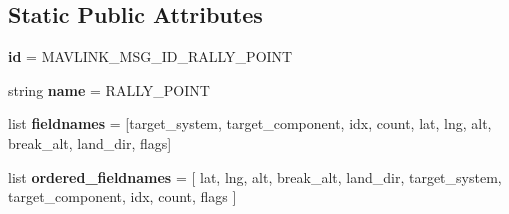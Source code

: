 \subsection*{Static Public Attributes}
\begin{DoxyCompactItemize}
\item 
\mbox{\label{classpymavlink_1_1dialects_1_1v10_1_1MAVLink__rally__point__message_ada641cb5fb37a97a94c88d9fa60c417f}} 
{\bfseries id} = M\+A\+V\+L\+I\+N\+K\+\_\+\+M\+S\+G\+\_\+\+I\+D\+\_\+\+R\+A\+L\+L\+Y\+\_\+\+P\+O\+I\+NT
\item 
\mbox{\label{classpymavlink_1_1dialects_1_1v10_1_1MAVLink__rally__point__message_ae863ad6e47a51b3049ac8678e47e5eeb}} 
string {\bfseries name} = \textquotesingle{}R\+A\+L\+L\+Y\+\_\+\+P\+O\+I\+NT\textquotesingle{}
\item 
\mbox{\label{classpymavlink_1_1dialects_1_1v10_1_1MAVLink__rally__point__message_a72ef1a386d515ff1b5e73f6b8b97f93c}} 
list {\bfseries fieldnames} = \mbox{[}\textquotesingle{}target\+\_\+system\textquotesingle{}, \textquotesingle{}target\+\_\+component\textquotesingle{}, \textquotesingle{}idx\textquotesingle{}, \textquotesingle{}count\textquotesingle{}, \textquotesingle{}lat\textquotesingle{}, \textquotesingle{}lng\textquotesingle{}, \textquotesingle{}alt\textquotesingle{}, \textquotesingle{}break\+\_\+alt\textquotesingle{}, \textquotesingle{}land\+\_\+dir\textquotesingle{}, \textquotesingle{}flags\textquotesingle{}\mbox{]}
\item 
\mbox{\label{classpymavlink_1_1dialects_1_1v10_1_1MAVLink__rally__point__message_a45daac092b58d854641dece2f27754f7}} 
list {\bfseries ordered\+\_\+fieldnames} = \mbox{[} \textquotesingle{}lat\textquotesingle{}, \textquotesingle{}lng\textquotesingle{}, \textquotesingle{}alt\textquotesingle{}, \textquotesingle{}break\+\_\+alt\textquotesingle{}, \textquotesingle{}land\+\_\+dir\textquotesingle{}, \textquotesingle{}target\+\_\+system\textquotesingle{}, \textquotesingle{}target\+\_\+component\textquotesingle{}, \textquotesingle{}idx\textquotesingle{}, \textquotesingle{}count\textquotesingle{}, \textquotesingle{}flags\textquotesingle{} \mbox{]}

\end{DoxyCompactItemize}
